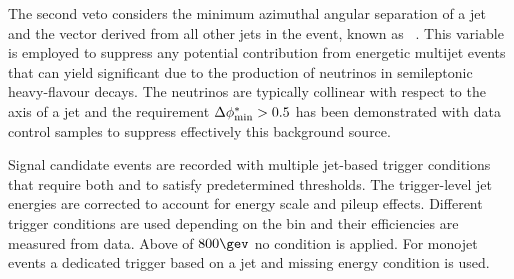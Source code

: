 The second veto considers the minimum azimuthal angular separation of
a jet and the \mht vector derived from all other jets in the event,
known as \dphi~\cite{RA1Paper}. This variable is employed to suppress
any potential contribution from energetic multijet events that can
yield significant \met due to the production of neutrinos in
semileptonic heavy-flavour decays. The neutrinos are typically
collinear with respect to the axis of a jet and the requirement $\Delta\phi^{*}_{\rm min}
> 0.5$ has been demonstrated with data control samples to suppress
effectively this background source.



Signal candidate events are recorded with multiple jet-based trigger
conditions that require both \scalht and \alphat to satisfy
predetermined thresholds. The trigger-level jet energies are corrected
to account for energy scale and pileup effects. Different trigger
conditions are used depending on the \scalht bin and their
efficiencies are measured from data. Above \scalht of $800\gev$ no 
\alphat condition is applied. For monojet events a dedicated trigger based on a jet and missing energy condition is used.

